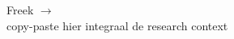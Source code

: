 \graphicspath{ {../03-research-context/} }

\begin{tcolorbox}[colback=yellow!30]
  
  Freek $\rightarrow$ \\
   copy-paste hier integraal de research context
  
\end{tcolorbox}





